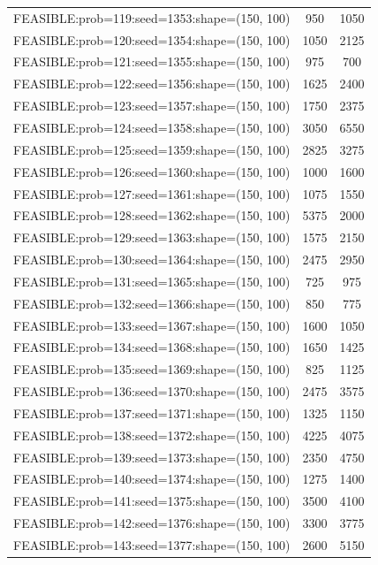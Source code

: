 \begin{longtable}{lcc}
FEASIBLE:prob=119:seed=1353:shape=(150, 100) &      950 &  1050 \\
FEASIBLE:prob=120:seed=1354:shape=(150, 100) &     1050 &  2125 \\
FEASIBLE:prob=121:seed=1355:shape=(150, 100) &      975 &   700 \\
FEASIBLE:prob=122:seed=1356:shape=(150, 100) &     1625 &  2400 \\
FEASIBLE:prob=123:seed=1357:shape=(150, 100) &     1750 &  2375 \\
FEASIBLE:prob=124:seed=1358:shape=(150, 100) &     3050 &  6550 \\
FEASIBLE:prob=125:seed=1359:shape=(150, 100) &     2825 &  3275 \\
FEASIBLE:prob=126:seed=1360:shape=(150, 100) &     1000 &  1600 \\
FEASIBLE:prob=127:seed=1361:shape=(150, 100) &     1075 &  1550 \\
FEASIBLE:prob=128:seed=1362:shape=(150, 100) &     5375 &  2000 \\
FEASIBLE:prob=129:seed=1363:shape=(150, 100) &     1575 &  2150 \\
FEASIBLE:prob=130:seed=1364:shape=(150, 100) &     2475 &  2950 \\
FEASIBLE:prob=131:seed=1365:shape=(150, 100) &      725 &   975 \\
FEASIBLE:prob=132:seed=1366:shape=(150, 100) &      850 &   775 \\
FEASIBLE:prob=133:seed=1367:shape=(150, 100) &     1600 &  1050 \\
FEASIBLE:prob=134:seed=1368:shape=(150, 100) &     1650 &  1425 \\
FEASIBLE:prob=135:seed=1369:shape=(150, 100) &      825 &  1125 \\
FEASIBLE:prob=136:seed=1370:shape=(150, 100) &     2475 &  3575 \\
FEASIBLE:prob=137:seed=1371:shape=(150, 100) &     1325 &  1150 \\
FEASIBLE:prob=138:seed=1372:shape=(150, 100) &     4225 &  4075 \\
FEASIBLE:prob=139:seed=1373:shape=(150, 100) &     2350 &  4750 \\
FEASIBLE:prob=140:seed=1374:shape=(150, 100) &     1275 &  1400 \\
FEASIBLE:prob=141:seed=1375:shape=(150, 100) &     3500 &  4100 \\
FEASIBLE:prob=142:seed=1376:shape=(150, 100) &     3300 &  3775 \\
FEASIBLE:prob=143:seed=1377:shape=(150, 100) &     2600 &  5150 \\

\end{longtable}
